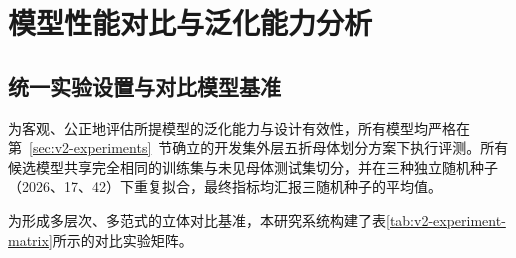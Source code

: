 \section{模型性能对比与泛化能力分析}

\subsection{统一实验设置与对比模型基准}

为客观、公正地评估所提模型的泛化能力与设计有效性，所有模型均严格在第~\ref{sec:v2-experiments}~节确立的开发集外层五折母体划分方案下执行评测。所有候选模型共享完全相同的训练集与未见母体测试集切分，并在三种独立随机种子（2026、17、42）下重复拟合，最终指标均汇报三随机种子的平均值。

为形成多层次、多范式的立体对比基准，本研究系统构建了表\ref{tab:v2-experiment-matrix}所示的对比实验矩阵。

